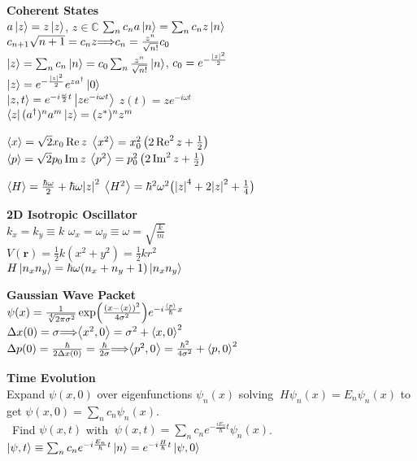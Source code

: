 \documentclass[11pt, a4paper]{article}
\newcommand{\newsec}[1]{\vspace{2mm}\textbf{#1}\\}
\renewcommand{\vec}[1]{\bm{#1}} %
\let\spaceyimplies\implies
\renewcommand{\implies}{\hspace{-1mm}\spaceyimplies\hspace{-1mm}}
\begin{document}
\begin{multicols}{2}
\newsec{Coherent States}
$ a \ket{z} = z \ket{z} $, $ z \in \mathbb{C} $ \qquad $ \sum_{n} c_{n} a \ket{n} = \sum_{n} c_{n} z \ket{n} $\\
$ c_{n+1}\sqrt{n+1} = c_{n}z \implies c_{n} = \frac{z^{n}}{\sqrt{n!}}c_{0} $\\
$ \ket{z} = \sum_{n}c_{n} \ket{n} = c_{0} \sum_{n} \frac{z^{n}}{\sqrt{n!}}\ket{n} $, \quad $ c_{0} = e^{-\frac{\abs{z}^{2}}{2}} $\\
$ \ket{z} =  e^{-\frac{\abs{z}^{2}}{2}}  e^{za^{\dagger}} \ket{0} $\\
$ \ket{z, t} = e^{-i \frac{\omega}{2}t} \ket{z e^{-i\omega t}} $ \qquad $ z(t) = ze^{-i\omega t} $\\
$ \bra{z}(a^{\dagger})^{n}a^{m}\ket{z} = (z^{*})^{n}z^{m} $

$ \ev{x} = \sqrt{2} x_{0}\Re z $ \qquad $ \ev{x^{2}}  = x_{0}^{2}\left(2 \Re^{2}z + \tfrac{1}{2}\right) $\\
$ \ev{p} = \sqrt{2}p_{0}\Im z $ \qquad $ \ev{p^{2}} = p_{0}^{2}\left(2 \Im^{2}z + \tfrac{1}{2}\right) $

$ \ev{H} = \frac{\hbar \omega}{2} + \hbar \omega \abs{z}^{2} $ \quad $ \ev{H^{2}} = \hbar^{2} \omega^{2} \big(\abs{z}^{4} + 2\abs{z}^{2} + \tfrac{1}{4}\big) $


\newsec{2D Isotropic Oscillator}
$ k_{x} = k_{y} \equiv k $ \quad  $ \omega_{x} = \omega_{y} \equiv \omega = \sqrt{\frac{k}{m}}$\\
$ V(\vec{r}) = \frac{1}{2}k(x^{2} + y^{2}) = \frac{1}{2}kr^{2} $\\
$ H\ket{n_{x}n_{y}} = \hbar \omega (n_{x} + n_{y} + 1)\ket{n_{x}n_{y}} $


\newsec{Gaussian Wave Packet}
$ \psi(x) = \frac{1}{\sqrt[4]{2\pi \sigma^{2}}} \exp(\frac{(x - \ev{x})^{2}}{4 \sigma^{2}})e^{-i\frac{\ev{p}}{\hbar}x} $\\
$ \Delta x(0) = \sigma \implies \ev{x^{2}, 0} = \sigma^{2} + \ev{x, 0}^{2} $\\
$ \Delta p(0) = \frac{\hbar}{2\Delta x(0)} = \frac{\hbar}{2\sigma} \implies \ev{p^{2}, 0} = \frac{\hbar^{2}}{4\sigma^{2}} + \ev{p, 0}^{2} $

\newsec{Time Evolution}
Expand $ \psi(x, 0) $ over eigenfunctions $ \psi_{n}(x) $ solving
${} \ H \psi_{n}(x) = E_{n}\psi_{n}(x) $ to get $ \psi(x, 0) = \sum_{n} c_{n} \psi_{n}(x) $. \\[1mm]
\null \ Find $ \psi(x, t) $ with ${} \ \psi(x, t) = \sum_{n} c_{n}e^{-\frac{iE_{n}}{\hbar}t}\psi_{n}(x) $.\\
$ \ket{\psi, t} \equiv \sum_{n} c_{n}e^{-i \frac{E_{n}}{\hbar}t}\ket{n} = e^{-i\frac{H}{\hbar}t}\ket{\psi, 0} $


\end{multicols}
\end{document}
